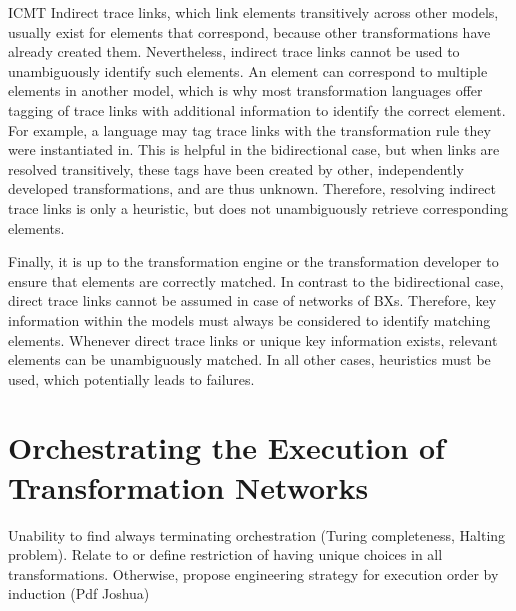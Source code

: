 \begin{copiedFrom}{ICMT}
Indirect trace links, which link elements transitively across other models, usually exist for elements that correspond, because other transformations have already created them.
Nevertheless, indirect trace links cannot be used to unambiguously identify such elements.
An element can correspond to multiple elements in another model, which is why most transformation languages offer tagging of trace links with additional information to identify the correct element.
For example, a language may tag trace links with the transformation rule they were instantiated in.
This is helpful in the bidirectional case, but when links are resolved transitively, these tags have been created by other, independently developed transformations, and are thus unknown.
Therefore, resolving indirect trace links is only a heuristic, but does not unambiguously retrieve corresponding elements.



Finally, it is up to the transformation engine or the transformation developer %
to ensure that elements are correctly matched.
In contrast to the bidirectional case, direct trace links cannot be assumed in case of networks of \acp{BX}.
Therefore, key information within the models must always be considered to identify matching elements.
Whenever direct trace links or unique key information exists, relevant elements can be unambiguously matched.
In all other cases, heuristics must be used, which potentially leads to failures.

\end{copiedFrom} %



\section{Orchestrating the Execution of Transformation Networks }
Unability to find always terminating orchestration (Turing completeness, Halting problem). Relate to or define restriction of having unique choices in all transformations. Otherwise, propose engineering strategy for execution order by induction (Pdf Joshua)



